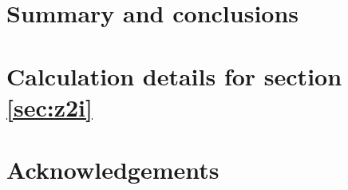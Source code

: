 \documentclass{amsart}
\theoremstyle{plain}
\theoremstyle{definition}
\theoremstyle{remark}
\begin{document}
    \section{Summary and conclusions}
	

	\appendix
	\section{Calculation details for section \ref{sec:z2i}}
	\label{sec:appendix_z2_i}
	
	
	\section*{Acknowledgements}
	
    
	
	
\end{document}
